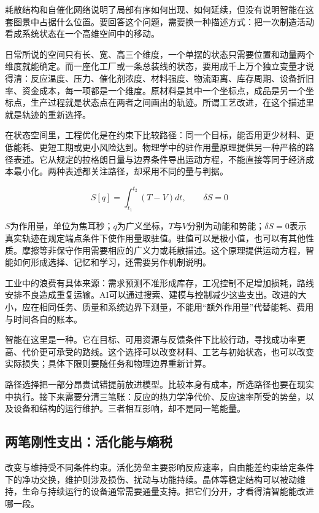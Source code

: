 
耗散结构和自催化网络说明了局部有序如何出现、如何延续，但没有说明智能在这套图景中占据什么位置。要回答这个问题，需要换一种描述方式：把一次制造活动看成系统状态在一个高维空间中的移动。

日常所说的空间只有长、宽、高三个维度，一个单摆的状态只需要位置和动量两个维度就能确定。而一座化工厂或一条总装线的状态，要用成千上万个独立变量才说得清：反应温度、压力、催化剂浓度、材料强度、物流距离、库存周期、设备折旧率、资金成本，每一项都是一个维度。原材料是其中一个坐标点，成品是另一个坐标点，生产过程就是状态点在两者之间画出的轨迹。所谓工艺改进，在这个描述里就是轨迹的重新选择。

在状态空间里，工程优化是在约束下比较路径：同一个目标，能否用更少材料、更低能耗、更短工期或更小风险达到。物理学中的驻作用量原理提供另一种严格的路径表述。它从规定的拉格朗日量与边界条件导出运动方程，不能直接等同于经济成本最小化。两种表述都关注路径，却采用不同的量与判据。

\begin{equation}
S[q]=\int_{t_{1}}^{t_{2}}\left(T-V\right)dt,
\qquad
\delta S=0
\end{equation}

$S$为作用量，单位为焦耳秒；$q$为广义坐标，$T$与$V$分别为动能和势能；$\delta S=0$表示真实轨迹在规定端点条件下使作用量取驻值。驻值可以是极小值，也可以有其他性质。摩擦等非保守作用需要相应的广义力或耗散描述。这个原理提供运动方程，智能如何形成选择、记忆和学习，还需要另作机制说明。

工业中的浪费有具体来源：需求预测不准形成库存，工况控制不足增加损耗，路线安排不良造成重复运输。AI可以通过搜索、建模与控制减少这些支出。改进的大小，应在相同任务、质量和系统边界下测量，不能用“额外作用量”代替能耗、费用与时间各自的账本。

智能在这里是一种。它在目标、可用资源与反馈条件下比较行动，寻找成功率更高、代价更可承受的路线。这个选择可以改变材料、工艺与初始状态，也可以改变实际损失；具体下限则要随任务和物理边界重新计算。

路径选择把一部分昂贵试错提前放进模型。比较本身有成本，所选路径也要在现实中执行。接下来需要分清三笔账：反应的热力学净代价、反应速率所受的势垒，以及设备和结构的运行维护。三者相互影响，却不是同一笔能量。

\subsection{两笔刚性支出：活化能与熵税}

改变与维持受不同条件约束。活化势垒主要影响反应速率，自由能差约束给定条件下的净功交换，维护则涉及损伤、扰动与功能持续。晶体等稳定结构可以被动维持，生命与持续运行的设备通常需要通量支持。把它们分开，才看得清智能能改进哪一段。

